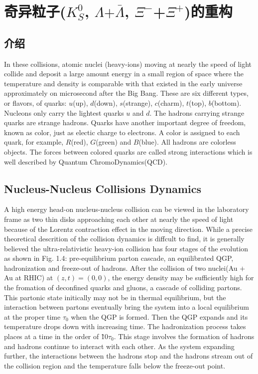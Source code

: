 \newcommand{\KAONS}{$K^{0}_{S}$}
\newcommand{\ANTILAMBDAS}{$\bar{\Lambda}$}
\newcommand{\XIMINUSS}{$\Xi^{-}$}
\newcommand{\XIPLUSS}{$\Xi^{+}$}
\newcommand{\mTS}{$m_{T}$}

\chapter{奇异粒子(\KAONS, $\Lambda$$+$\ANTILAMBDAS, \XIMINUSS+\XIPLUSS)的重构}
\section{介绍}
In these collisions, atomic nuclei (heavy-ions) moving at nearly the speed of light collide and deposit a large amount energy in a small region of space where the temperature and density is comparable with that existed in the early universe approximately on microsecond after the Big Bang.
These are six different types, or flavors, of quarks: $u$(up), $d$(down), $s$(strange), $c$(charm), $t$(top), $b$(bottom).
Nucleons only carry the lightest quarks $u$ and $d$.
The hadrons carrying strange quarks are strange hadrons.
Quarks have another important degree of freedom, known as color, just as electic charge to electrons.
A color is assigned to each quark,
for example, $R$(red), $G$(green) and $B$(blue).
All hadrons are colorless objects.
The forces between colored quarks are called strong interactions which is well described by Quantum ChromoDynamics(QCD).

\section{Nucleus-Nucleus Collisions Dynamics}
A high energy head-on nucleus-nucleus collision can be viewed in the laboratory frame as two thin disks approaching each other at nearly the speed of light because of the Lorentz contraction effect in the moving direction.
While a precise theoretical descrition of the collision dynamics is diffcult to find,
it is generally believed the ultra-relativistic heavy-ion collision has four stages of the evolution as shown in Fig. 1.4: pre-equilibrium parton cascade, an equilibrated QGP, hadronization and freeze-out of hadrons.
After the collision of two nuclei(Au $+$ Au at RHIC) at $(z, t) = (0, 0)$,
the energy density may be sufficiently high for the fromation of deconfined quarks and gluons,
a cascade of colliding partons.
This partonic state initically may not be in thermal equilibrium,
but the interaction between partons eventually bring the system into a local equilibrium at the proper time $\tau_{0}$ when the QGP is formed.
Then the QGP expands and its temperature drops down with increasing time.
The hadronization process takes places at a time in the order of \~ 10$\tau_{0}$.
This stage involves the formation of hadrons and hadrons continue to interact with each other.
As the system expanding further,
the interactions between the hadrons stop and the hadrons stream out of the collision region and the temperature falls below the freeze-out point.

